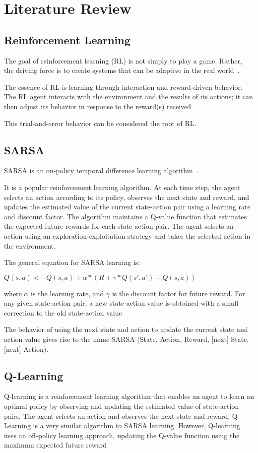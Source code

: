 \section{Literature Review}

\subsection{Reinforcement Learning}
The goal of reinforcement learning (RL) is not simply to play a game. Rather, the driving force is to create systems that can be adaptive in the real world~\cite{Arulkumaran_2017}.

The essence of RL is learning through interaction and reward-driven behavior. The RL agent interacts with the environment and the results of its actions; it can then adjust its behavior in
response to the reward(s) received~\citep{Arulkumaran_2017}

This trial-and-error behavior can be considered the root of RL.

\subsection{SARSA}
SARSA is an on-policy temporal difference learning algorithm~\citep{sutton2018reinforcement}.

It is a popular reinforcement learning algorithm. At each time step, the agent selects an action according to its policy, observes the next state and reward, and updates the estimated value of the current state-action pair using a learning rate and discount factor. 
The algorithm maintains a Q-value function that estimates the expected future rewards for each state-action pair. The agent selects an action using an exploration-exploitation strategy and takes the selected action in the environment.

The general equation for SARSA learning is:

$Q(s,a) <- Q(s,a) + \alpha*(R + \gamma*Q(s',a') - Q(s,a))$

where $\alpha$ is the learning rate, and $\gamma$ is the discount factor for future reward. For any given state-action pair, a new state-action value is obtained
with a small correction to the old state-action value~\citep{graepel2004learning}

The behavior of using the next state and action to update the current state and action value gives rise to the name SARSA (State, Action, Reward, [next] State, [next] Action).

\subsection{Q-Learning}
Q-learning is a reinforcement learning algorithm that enables an agent to learn an optimal policy by observing and updating the estimated value of state-action pairs. 
The agent selects an action and observes the next state and reward.
Q-Learning is a very similar algorithm to SARSA learning. However, Q-learning uses an off-policy learning approach, updating the Q-value function using the maximum expected future reward